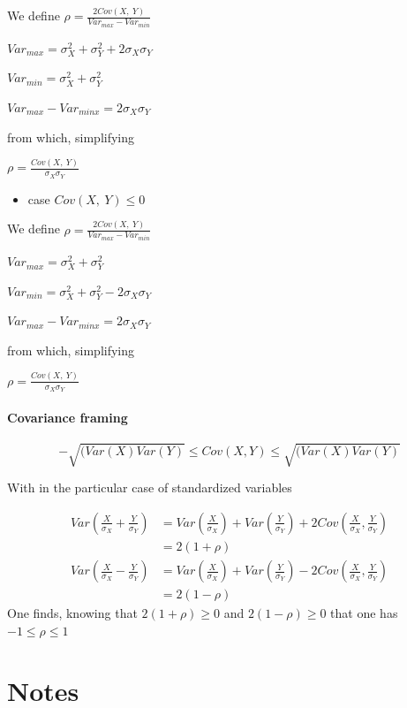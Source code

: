 \documentclass[
]{report}
\providecommand{\tightlist}{%
  \setlength{\itemsep}{0pt}\setlength{\parskip}{0pt}}
\begin{document}
We define
\(\rho = \frac{2Cov(X,~Y)}{Var_{max}-Var_{min}}\)

\(Var_{max} = \sigma_X^2+\sigma_Y^2+2\sigma_X\sigma_Y\)

\(Var_{min} = \sigma_X^2+\sigma_Y^2\)

\(Var_{max}-Var_{minx} = 2\sigma_X\sigma_Y\)

from which, simplifying

\(\rho = \frac{Cov(X,~Y)}{\sigma_X\sigma_Y}\)

\begin{itemize}
\tightlist
\item
  case \(Cov(X,~Y)\leq 0\)
\end{itemize}

We define
\(\rho = \frac{2Cov(X,~Y)}{Var_{max}-Var_{min}}\)

\(Var_{max} = \sigma_X^2+\sigma_Y^2\)

\(Var_{min} = \sigma_X^2+\sigma_Y^2-2\sigma_X\sigma_Y\)

\(Var_{max}-Var_{minx} = 2\sigma_X\sigma_Y\)

from which, simplifying

\(\rho = \frac{Cov(X,~Y)}{\sigma_X\sigma_Y}\)

\hypertarget{covariance-framing}{%
\subsubsection{Covariance framing}\label{covariance-framing}}

\[-\sqrt{(Var(X)Var(Y)} \leq Cov(X,Y) \leq \sqrt{(Var(X)Var(Y)}\]

With in the particular case of standardized variables

\begin{align*}
Var(\frac{X}{\sigma_X}+\frac{Y}{\sigma_Y})&= Var(\frac{X}{\sigma_X})+Var(\frac{Y}{\sigma_Y})+2Cov(\frac{X}{\sigma_X},\frac{Y}{\sigma_Y})\\
&=2(1+\rho)\\
Var(\frac{X}{\sigma_X}-\frac{Y}{\sigma_Y})&= Var(\frac{X}{\sigma_X})+Var(\frac{Y}{\sigma_Y})-2Cov(\frac{X}{\sigma_X},\frac{Y}{\sigma_Y})\\
&=2(1-\rho)
\end{align*}
One finds, knowing that \(2(1+\rho) \geq 0\) and \(2(1-\rho)\geq 0\) that one has \(-1 \le \rho \le 1\)

\hypertarget{notes}{%
\chapter{Notes}\label{notes}}
\end{document}
